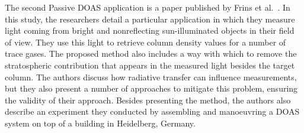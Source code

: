 The second Passive DOAS application is a paper published by Frins et
al.~\cite{Frins2006}. In this study, the researchers detail a particular
application in which they measure light coming from bright and
nonreflecting sun-illuminated objects in their field of view. They use
this light to retrieve column density values for a number of trace
gases. The proposed method also includes a way with which to remove the
stratospheric contribution that appears in the measured light besides
the target column. The authors discuss how radiative transfer can
influence measurements, but they also present a number of approaches to
mitigate this problem, ensuring the validity of their approach.  Besides
presenting the method, the authors also describe an experiment they
conducted by assembling and manoeuvring a DOAS system on top of a
building in Heidelberg, Germany.

